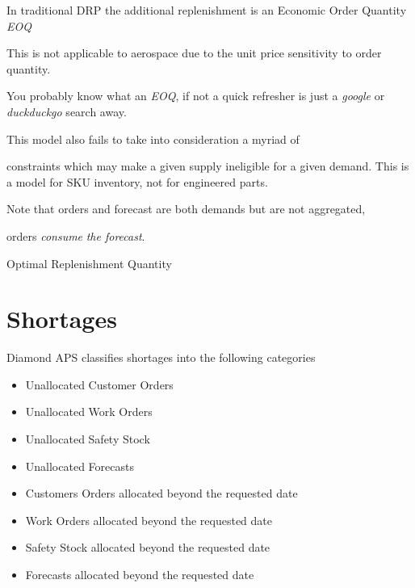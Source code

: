 \documentclass[letterpaper,10pt,english]{sphinxmanual}
\begin{document}
In traditional DRP the additional replenishment is an Economic Order
Quantity \emph{EOQ}

This is not applicable to aerospace due to the unit price sensitivity to
order quantity.

You probably know what an \emph{EOQ}, if not a quick refresher is just a
\emph{google} or \emph{duckduckgo} search away.

\begin{DUlineblock}{0em}
\item[] This model also fails to take into consideration a myriad of
\end{DUlineblock}

constraints which may
\textbar{} make a given supply ineligible for a given demand. This is a model for
SKU inventory,
\textbar{} not for engineered parts.

\begin{DUlineblock}{0em}
\item[] Note that orders and forecast are both demands but are not aggregated,
\end{DUlineblock}

orders \emph{consume}
\textbar{} \emph{the forecast}.

Optimal Replenishment Quantity


\section{Shortages}
\label{APS/APS-Features-and-Benefits:shortages}
Diamond APS classifies shortages into the following categories
\begin{itemize}
\item {} 
Unallocated Customer Orders

\item {} 
Unallocated Work Orders

\item {} 
Unallocated Safety Stock

\item {} 
Unallocated Forecasts

\item {} 
Customers Orders allocated beyond the requested date

\item {} 
Work Orders allocated beyond the requested date

\item {} 
Safety Stock allocated beyond the requested date

\item {} 
Forecasts allocated beyond the requested date

\end{itemize}
\end{document}
